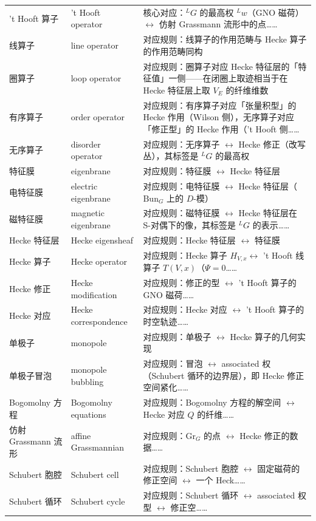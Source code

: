 \begin{longtable}{@{}p{4.3cm}p{2.6cm}p{8.8cm}@{}}
't Hooft 算子 & 't Hooft operator & 核心对应：${}^LG$ 的最高权 ${}^Lw$（GNO 磁荷）$\leftrightarrow$ 仿射 Grassmann 流形中的点…… \\
线算子 & line operator & 对应规则：线算子的作用范畴与 Hecke 算子的作用范畴同构 \\
圈算子 & loop operator & 对应规则：圈算子对应 Hecke 特征层的「特征值」一侧——在闭圈上取迹相当于在 Hecke 特征层上取 $V_E$ 的纤维维数 \\
有序算子 & order operator & 对应规则：有序算子对应「张量积型」的 Hecke 作用（Wilson 侧），无序算子对应「修正型」的 Hecke 作用（'t Hooft 侧…… \\
无序算子 & disorder operator & 对应规则：无序算子 $\leftrightarrow$ Hecke 修正（改写丛），其标签是 ${}^LG$ 的最高权 \\
特征膜 & eigenbrane & 对应规则：特征膜 $\leftrightarrow$ Hecke 特征层 \\
电特征膜 & electric eigenbrane & 对应规则：电特征膜 $\leftrightarrow$ Hecke 特征层（$\mathrm{Bun}_G$ 上的 $D$-模） \\
磁特征膜 & magnetic eigenbrane & 对应规则：磁特征膜 $\leftrightarrow$ Hecke 特征层在 S-对偶下的像，其标签是 ${}^LG$ 的表示…… \\
Hecke 特征层 & Hecke eigensheaf & 对应规则：Hecke 特征层 $\leftrightarrow$ 特征膜 \\
Hecke 算子 & Hecke operator & 对应规则：Hecke 算子 $H_{V,x} \leftrightarrow$ 't Hooft 线算子 $T(V,x)$（$\Psi=0$…… \\
Hecke 修正 & Hecke modification & 对应规则：修正的型 $\leftrightarrow$ 't Hooft 算子的 GNO 磁荷…… \\
Hecke 对应 & Hecke correspondence & 对应规则：Hecke 对应 $\leftrightarrow$ 't Hooft 算子的时空轨迹…… \\
单极子 & monopole & 对应规则：单极子 $\leftrightarrow$ Hecke 算子的几何实现 \\
单极子冒泡 & monopole bubbling & 对应规则：冒泡 $\leftrightarrow$ associated 权（Schubert 循环的边界层），即 Hecke 修正空间紧化…… \\
Bogomolny 方程 & Bogomolny equations & 对应规则：Bogomolny 方程的解空间 $\leftrightarrow$ Hecke 对应 $Q$ 的纤维…… \\
仿射 Grassmann 流形 & affine Grassmannian & 对应规则：$\mathrm{Gr}_G$ 的点 $\leftrightarrow$ Hecke 修正的数据…… \\
Schubert 胞腔 & Schubert cell & 对应规则：Schubert 胞腔 $\leftrightarrow$ 固定磁荷的修正空间 $\leftrightarrow$ 一个 Heck…… \\
Schubert 循环 & Schubert cycle & 对应规则：Schubert 循环 $\leftrightarrow$ associated 权型 $\leftrightarrow$ 修正空…… \\

\end{longtable}
